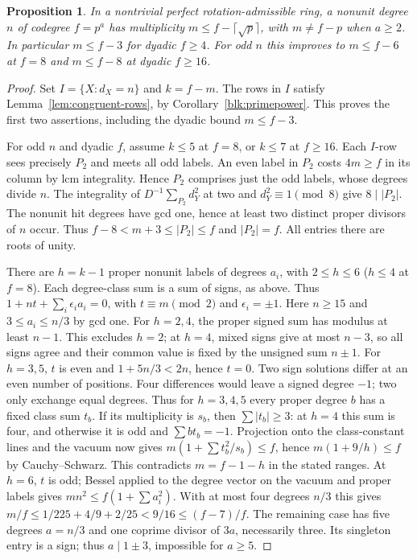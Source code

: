 \documentclass[11pt]{amsart}
\numberwithin{equation}{section}
\newtheorem{proposition}[theorem]{Proposition}
\theoremstyle{definition}
\theoremstyle{plain}
\begin{document}
\begin{proposition}\label{sq:saturation}
In a nontrivial perfect rotation-admissible ring, a nonunit degree $n$
of codegree $f=p^a$ has multiplicity $m\le f-\lceil\sqrt p\rceil$,
with $m\ne f-p$ when $a\ge2$. In particular $m\le f-3$ for dyadic
$f\ge4$. For odd $n$ this improves to $m\le f-6$ at $f=8$ and
$m\le f-8$ at dyadic $f\ge16$.
\end{proposition}
\begin{proof}
Set $I=\{X:d_X=n\}$ and $k=f-m$.
The rows in $I$ satisfy Lemma~\ref{lem:congruent-rows}, by
Corollary~\ref{blk:primepower}. This proves the first two assertions,
including the dyadic bound $m\le f-3$.

For odd $n$ and dyadic $f$, assume $k\le5$ at $f=8$, or $k\le7$ at
$f\ge16$. Each $I$-row sees precisely $P_2$ and meets all odd labels.
An even label in $P_2$ costs $4m\ge f$ in its column by lcm integrality.
Hence $P_2$ comprises just the odd labels, whose degrees divide $n$.
The integrality of $D^{-1}\sum_{P_2}d_Y^2$ at two and $d_Y^2\equiv1\pmod8$
give $8\mid|P_2|$. The nonunit hit degrees have gcd one, hence at
least two distinct proper divisors of $n$ occur. Thus
$f-8<m+3\le|P_2|\le f$ and $|P_2|=f$. All entries there are roots of unity.

There are $h=k-1$ proper nonunit labels of degrees $a_i$, with $2\le h\le6$
($h\le4$ at $f=8$). Each degree-class sum is a sum of signs, as above.
Thus $1+nt+\sum_i\epsilon_i a_i=0$, with $t\equiv m\pmod2$ and
$\epsilon_i=\pm1$. Here $n\ge15$ and $3\le a_i\le n/3$ by gcd one.
For $h=2,4$, the proper signed sum has modulus at least $n-1$.
This excludes $h=2$; at $h=4$, mixed signs give at most $n-3$,
so all signs agree and their common value is fixed by the unsigned
sum $n\pm1$. For $h=3,5$, $t$ is even and
$1+5n/3<2n$, hence $t=0$. Two sign solutions differ at an even
number of positions. Four differences would leave a signed degree
$-1$; two only exchange equal degrees. Thus for $h=3,4,5$ every
proper degree $b$ has a fixed class sum $t_b$. If its multiplicity
is $s_b$, then $\sum|t_b|\ge3$: at $h=4$ this sum is four,
and otherwise it is odd and $\sum b t_b=-1$.
Projection onto the class-constant lines and the vacuum now gives
$m(1+\sum t_b^2/s_b)\le f$, hence $m(1+9/h)\le f$ by
Cauchy--Schwarz. This contradicts $m=f-1-h$ in the stated ranges.
At $h=6$, $t$ is odd; Bessel applied to the degree
vector on the vacuum and proper labels gives
$m n^2\le f(1+\sum a_i^2)$. With at most four degrees $n/3$ this gives
$m/f\le1/225+4/9+2/25<9/16\le(f-7)/f$. The remaining case has five
degrees $a=n/3$ and one coprime divisor of $3a$, necessarily three.
Its singleton entry is a sign; thus $a\mid1\pm3$, impossible for $a\ge5$.
\end{proof}
\end{document}
